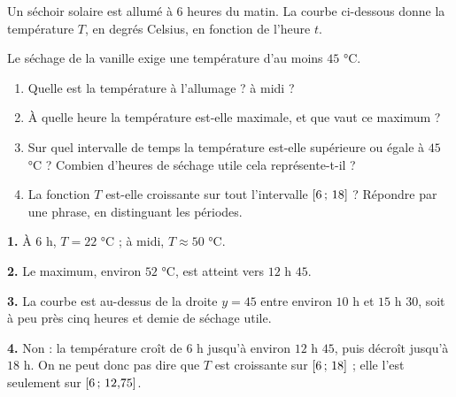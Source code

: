 \begin{situation}
Un séchoir solaire est allumé à $6$ heures du matin. La courbe ci-dessous
donne la température $T$, en degrés Celsius, en fonction de l'heure $t$.

\begin{center}
\end{center}

Le séchage de la vanille exige une température d'au moins $45$ °C.

\begin{enumerate}[label=\textbf{\arabic*.}, leftmargin=*, itemsep=0.3em]
  \item Quelle est la température à l'allumage ? à midi ?
  \item À quelle heure la température est-elle maximale, et que vaut ce
        maximum ?
  \item Sur quel intervalle de temps la température est-elle supérieure ou
        égale à $45$ °C ? Combien d'heures de séchage utile cela
        représente-t-il ?
  \item La fonction $T$ est-elle croissante sur tout l'intervalle
        $\left[6\,;\,18\right]$ ? Répondre par une phrase, en distinguant les
        périodes.
\end{enumerate}
\end{situation}

\begin{corrige}
\textbf{1.} À $6$ h, $T = 22$ °C ; à midi, $T \approx 50$ °C.

\textbf{2.} Le maximum, environ $52$ °C, est atteint vers $12$ h $45$.

\textbf{3.} La courbe est au-dessus de la droite $y = 45$ entre environ
$10$ h et $15$ h $30$, soit à peu près cinq heures et demie de séchage
utile.

\textbf{4.} Non : la température croît de $6$ h jusqu'à environ $12$ h $45$,
puis décroît jusqu'à $18$ h. On ne peut donc pas dire que $T$ est croissante
sur $\left[6\,;\,18\right]$ ; elle l'est seulement sur
$\left[6\,;\,12{,}75\right]$.
\end{corrige}

